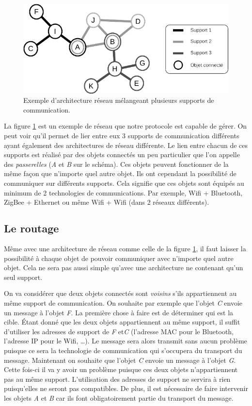       \begin{figure}[!ht]
         \centering
         \includegraphics[width=.8\textwidth]{img/multinet.png}
         \caption{Exemple d'architecture réseau mélangeant plusieurs supports de communication.}
         \label{multinet}
      \end{figure}
      
      La figure \ref{multinet} est un exemple de réseau que notre protocole est capable de gérer. On peut voir qu'il permet de lier entre eux 3 supports de communication différents ayant également des architectures de réseau différente. Le lien entre chacun de ces supports est réalisé par des objets connectés un peu particulier que l'on appelle des \emph{passerelles} 
		(\emph{A} et \emph{B} sur le schéma).
		Ces objets peuvent fonctionner de la même façon que n'importe quel autre objet. Ils ont cependant la possibilité de communiquer sur différents supports. Cela signifie que ces objets sont équipés au minimum de 2 technologies de communications. Par exemple, Wifi + Bluetooth,
		ZigBee + Ethernet ou même Wifi + Wifi (dans 2 réseaux différents).
		
	\subsection{Le routage}
		Même avec une architecture de réseau comme celle de la figure \ref{multinet}, il faut laisser la possibilité à chaque objet de pouvoir communiquer avec n'importe quel autre objet. Cela ne sera pas aussi simple qu'avec une architecture ne contenant qu'un seul support.
		
		On va considérer que deux objets connectés sont \emph{voisins} s'ils appartiennent au même	support de communication. On souhaite par exemple que l'objet \emph{C} envoie un message à l'objet \emph{F}. La première chose à faire est de déterminer qui est la cible. Étant donné que les deux objets appartiennent au même support, il suffit d'utiliser les adresses de support de \emph{F} et\emph{C} (l'adresse MAC pour le Bluetooth, l'adresse IP pour le Wifi, \dots). Le message sera alors		transmit sans aucun problème puisque ce sera la technologie de communication qui s'occupera 	du transport du message. Maintenant on souhaite que l'objet \emph{C} envoie un message à 
		l'objet \emph{G}. Cette fois-ci il va y avoir un problème puisque ces deux objets
		n'appartiennent pas au même support. L'utilisation des adresses de support ne servira à rien
		puisqu'elles ne seront pas compatibles. De plus, il est nécessaire de faire intervenir les
		objets \emph{A} et \emph{B} car ils font obligatoirement partie du transport du message.
		
